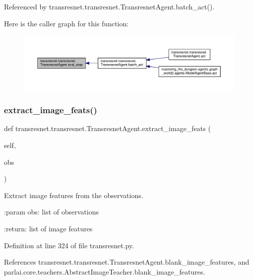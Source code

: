 Referenced by transresnet.\+transresnet.\+Transresnet\+Agent.\+batch\+\_\+act().

Here is the caller graph for this function\+:
\nopagebreak
\begin{figure}[H]
\begin{center}
\leavevmode
\includegraphics[width=350pt]{classtransresnet_1_1transresnet_1_1TransresnetAgent_aa5c56c53ab470893e92e0c35a5a802c7_icgraph}
\end{center}
\end{figure}
\mbox{\label{classtransresnet_1_1transresnet_1_1TransresnetAgent_a065c38b276b601ca97584fa4b9a76006}} 
\subsubsection{\texorpdfstring{extract\+\_\+image\+\_\+feats()}{extract\_image\_feats()}}
{\footnotesize\ttfamily def transresnet.\+transresnet.\+Transresnet\+Agent.\+extract\+\_\+image\+\_\+feats (\begin{DoxyParamCaption}\item[{}]{self,  }\item[{}]{obs }\end{DoxyParamCaption})}

\begin{DoxyVerb}Extract image features from the observations.

:param obs:
    list of observations

:return:
    list of image features
\end{DoxyVerb}
 

Definition at line 324 of file transresnet.\+py.



References transresnet.\+transresnet.\+Transresnet\+Agent.\+blank\+\_\+image\+\_\+features, and parlai.\+core.\+teachers.\+Abstract\+Image\+Teacher.\+blank\+\_\+image\+\_\+features.



